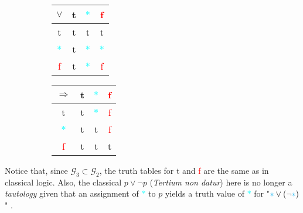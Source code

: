 \begin{figure}[h]
				\hfil
				\centering
			\begin{subfigure}[h]{0.3\textwidth}
				\begin{tabular}{||c || c | c | c ||}  
					\hline
					$ \lor $ & \textcolor{OliveGreen}{t} & \textcolor{cyan}{$*$} & \textcolor{red}{f} \\  
					\hline\hline
					\textcolor{OliveGreen}{t} & \textcolor{OliveGreen}{t} & \textcolor{OliveGreen}{t} & \textcolor{OliveGreen}{t}  \\ 
					\hline
					\textcolor{cyan}{$*$} & \textcolor{OliveGreen}{t} & \textcolor{cyan}{$*$} & \textcolor{cyan}{$*$} \\
					\hline
					\textcolor{red}{f} & \textcolor{OliveGreen}{t} & \textcolor{cyan}{$*$} & \textcolor{red}{f}  \\
					\hline
				\end{tabular}
				\caption{}
			\end{subfigure}
			\hfil
			\centering
		\begin{subfigure}[h]{0.3\textwidth}
			\begin{tabular}{||c || c | c | c ||}  
				\hline
				$ \Rightarrow $ & \textcolor{OliveGreen}{t} & \textcolor{cyan}{$*$} & \textcolor{red}{f} \\  
				\hline\hline
				\textcolor{OliveGreen}{t} & \textcolor{OliveGreen}{t} & \textcolor{cyan}{$*$} & \textcolor{red}{f}  \\ 
				\hline
				\textcolor{cyan}{$*$} & \textcolor{OliveGreen}{t} & \textcolor{OliveGreen}{t} & \textcolor{red}{f} \\
				\hline
				\textcolor{red}{f} & \textcolor{OliveGreen}{t} & \textcolor{OliveGreen}{t} & \textcolor{OliveGreen}{t}  \\
				\hline
			\end{tabular}
			\caption{}
		\end{subfigure}
				
				\end{figure}
				
			
			\begin{remark}
				Notice that, since $\mathcal{G}_3 \subset \mathcal{G}_2$, the truth tables for \textcolor{OliveGreen}{t} and \textcolor{red}{f} are the same as in classical logic.	\newline
				Also, the classical $p \lor \neg p$ (\emph{Tertium non datur}) here is no longer a \emph{tautology} given that an assignment of \textcolor{cyan}{$*$} to $p$ yields a truth value of \textcolor{cyan}{$*$} for "$ \textcolor{cyan}{*} \lor (\neg \textcolor{cyan}{*}) $" . \newline
			\end{remark}	
			
